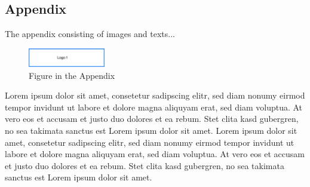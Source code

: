 \subsection*{Appendix}\label{appendix}

The appendix consisting of images and texts...

\begin{figure}[htb]
 \centering
 \includegraphics[width=0.3\textwidth,angle=0]{abb/logo1}
 \caption[Figure in the Appendix]{Figure in the Appendix}
 \label{fig:figure_in_appendix}
\end{figure}

Lorem ipsum dolor sit amet, consetetur sadipscing elitr, sed diam nonumy eirmod tempor invidunt ut labore et dolore magna aliquyam erat, sed diam voluptua. At vero eos et accusam et justo duo dolores et ea rebum. Stet clita kasd gubergren, no sea takimata sanctus est Lorem ipsum dolor sit amet. Lorem ipsum dolor sit amet, consetetur sadipscing elitr, sed diam nonumy eirmod tempor invidunt ut labore et dolore magna aliquyam erat, sed diam voluptua. At vero eos et accusam et justo duo dolores et ea rebum. Stet clita kasd gubergren, no sea takimata sanctus est Lorem ipsum dolor sit amet.
 